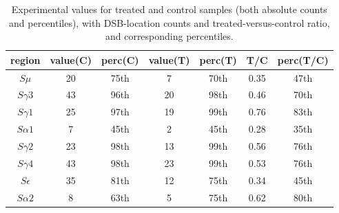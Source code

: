 \documentclass[11pt,a4paper]{article}
\begin{document}
\begin{table}
\centering
\begin{tabular}{|c|c|c|c|c|c|c|}
\hline 
region & value(C) & perc(C) & value(T) & perc(T) & T/C & perc(T/C) \\ 
\hline 
$S\mu$ & 20 & 75th & 7  & 70th & 0.35 & 47th\\
\hline
$S\gamma3$ & 43 & 96th & 20  & 98th & 0.46 & 70th\\
\hline
$S\gamma1$ & 25 & 97th & 19  & 99th & 0.76 & 83th\\
\hline
$S\alpha1$ & 7 & 45th & 2 & 45th & 0.28 & 35th\\
\hline
$S\gamma2$ & 23 & 98th & 13  & 99th & 0.56 & 76th\\
\hline
$S\gamma4$ & 43 & 98th & 23 & 99th & 0.53 & 76th\\
\hline
$S\epsilon$ & 35 & 81th & 12 & 75th & 0.34 & 45th\\
\hline
$S\alpha2$ & 8 & 63th & 5 & 75th & 0.62 & 80th\\
\hline
\end{tabular} 
\caption{Experimental values for treated and control samples (both absolute counts and percentiles), with DSB-location counts and treated-versus-control ratio, and corresponding percentiles.}
\label{tab:rm90_IGHregions_enrichment}
\end{table}
\end{document}
